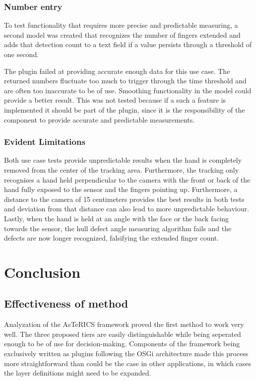 \documentclass[BSA,Bachelor,english]{twbook}%
\begin{document}
\subsection{Number entry}

To test functionality that requires more precise and predictable measuring, a second model was created that recognizes the number of fingers extended and adds that detection count to a text field if a value persists through a threshold of one second.

The plugin failed at providing accurate enough data for this use case. The returned numbers fluctuate too much to trigger through the time threshold and are often too inaccurate to be of use. Smoothing functionality in the model could provide a better result. This was not tested because if a such a feature is implemented it should be part of the plugin, since it is the responsibility of the component to provide accurate and predictable measurements.

\subsection{Evident Limitations}

Both use case tests provide unpredictable results when the hand is completely removed from the center of the tracking area. Furthermore, the tracking only recognises a hand held perpendicular to the camera with the front or back of the hand fully exposed to the sensor and the fingers pointing up. Furthermore, a distance to the camera of 15 centimeters provides the best results in both tests and deviation from that distance can also lead to more unpredictable behaviour.  Lastly, when the hand is held at an angle with the face or the back facing towards the sensor, the hull defect angle measuring algorithm fails and the defects are now longer recognized, falsifying the extended finger count.


\chapter{Conclusion}
\section{Effectiveness of method}

Analyzation of the AsTeRICS framework proved the first method to work very well. The three proposed tiers are easily distinguishable while being seperated enough to be of use for decision-making. Components of the framework being exclusively written as plugins following the OSGi architecture made this process more straightforward than could be the case in other applications, in which cases the layer definitions might need to be expanded.
\end{document}
